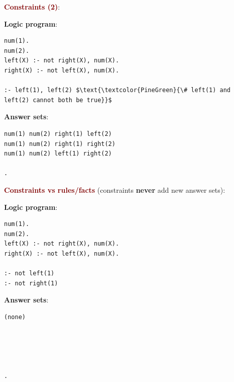 \vspace{0.35cm}

{\Large \textbf{\textcolor{Maroon}{Constraints (2)}}}: \\
\begin{minipage}{0.6\textwidth}
\textbf{Logic program}:
\begin{lstlisting}
num(1).
num(2).
left(X) :- not right(X), num(X).
right(X) :- not left(X), num(X).

:- left(1), left(2) $\text{\textcolor{PineGreen}{\# left(1) and left(2) cannot both be true}}$
\end{lstlisting}
\end{minipage}
\begin{minipage}{0.4\textwidth}
\textbf{Answer sets}:
\begin{lstlisting}
num(1) num(2) right(1) left(2)
num(1) num(2) right(1) right(2)
num(1) num(2) left(1) right(2)

.
\end{lstlisting}
\end{minipage}

\vspace{0.35cm}

{\Large \textbf{\textcolor{Maroon}{Constraints vs rules/facts}}} (constraints \textbf{never} add new answer sets): \\
\begin{minipage}{0.6\textwidth}
\textbf{Logic program}:
\begin{lstlisting}
num(1).
num(2).
left(X) :- not right(X), num(X).
right(X) :- not left(X), num(X).

:- not left(1) 
:- not right(1) 
\end{lstlisting}
\end{minipage}
\begin{minipage}{0.4\textwidth}
\textbf{Answer sets}:
\begin{lstlisting}
(none)





.
\end{lstlisting}
\end{minipage}

\vspace{0.35cm}

